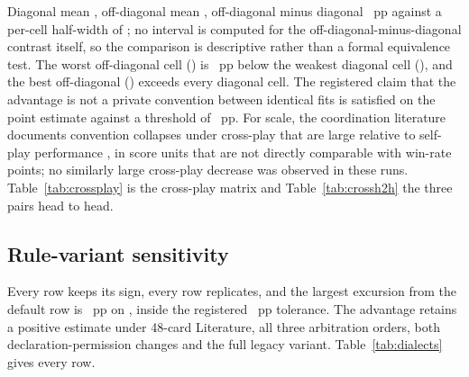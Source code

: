 Diagonal mean \vsevenXpDiagonal{}, off-diagonal mean \vsevenXpOffDiagonal{}, off-diagonal minus
diagonal \vsevenXpGap{}~pp against a per-cell half-width of \vsevenXpHalfWidth{}; no interval is
computed for the off-diagonal-minus-diagonal contrast itself, so the comparison is descriptive
rather than a formal equivalence test. The worst off-diagonal cell (\vsevenXpWorstOff{}) is
\vsevenXpWorstOffShortfall{}~pp below the weakest diagonal cell (\vsevenXpWeakestDiag{}), and the
best off-diagonal (\vsevenXpBestOff{}) exceeds every diagonal cell. The registered claim that the
advantage is not a private convention between identical fits is satisfied on the point estimate
against a threshold of \vsevenStwoThreshold{}~pp. For scale, the coordination literature documents
convention collapses under cross-play that are large relative to self-play performance
\cite{bard-hanabi,hu-otherplay}, in score units that are not directly comparable with win-rate
points; no similarly large cross-play decrease was observed in these runs.
Table~\ref{tab:crossplay} is the cross-play matrix and Table~\ref{tab:crossh2h} the three pairs
head to head.

\begin{table}[!ht]\centering
\caption{Cross-play. Three runs of the same architecture, trained separately with the same fitting
infrastructure on disjoint fitting banks, with different search trajectories and, for one, a
different starting basin; pairwise parameter
distance \vsevenXpDistanceLo{} to \vsevenXpDistanceHi{} over \vsevenCoordinates{} coordinates.}
\label{tab:crossplay}
{\tabfont}
\end{table}

\begin{table}[!ht]\centering
\caption{The three separately trained runs head to head. The nominal intervals for
\vsevenHtwohSeparated{} of the three pairs exclude zero; this is an observed separation under the
reported procedure, not a coverage-validated test. That the three parameter vectors are distinct
(Table~\ref{tab:crossplay}) is a separate fact from a demonstrated performance difference.}
\label{tab:crossh2h}
{\tabfont}
\end{table}

\subsection{Rule-variant sensitivity}
\label{sec:results-dialects}

Every row keeps its sign, every row replicates, and the largest excursion from the default row is
\vsevenDiaMaxExcursion{}~pp on \vsevenDiaMaxExcursionRow{}, inside the registered
\vsevenSfiveTolerance{}~pp tolerance. The advantage retains a positive estimate under 48-card
Literature, all three arbitration orders, both declaration-permission changes and the full legacy
variant. Table~\ref{tab:dialects} gives every row.

